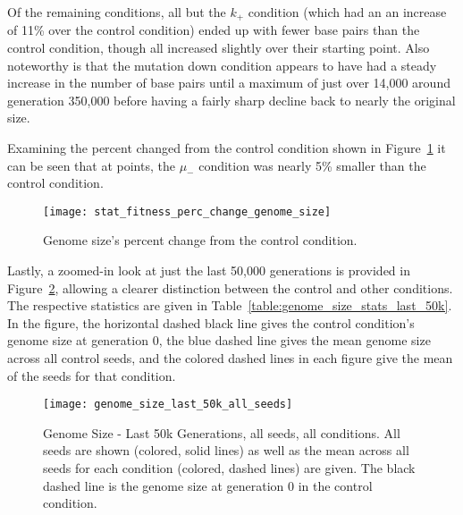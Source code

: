 Of the remaining conditions, all but the $k_+$ condition (which had an an increase of 11\% over the control condition) ended up with fewer base pairs than the control condition, though all increased slightly over their starting point. Also noteworthy is that the mutation down condition appears to have had a steady increase in the number of base pairs until a maximum of just over 14,000 around generation 350,000 before having a fairly sharp decline back to nearly the original size. 

Examining the percent changed from the control condition shown in Figure~\ref{fig:genome_size_percent_change} it can be seen that at points, the $\mu_-$ condition was nearly 5\% smaller than the control condition. 

\begin{figure}[H]
	\centering
	\texttt{[image: stat\_fitness\_perc\_change\_genome\_size]}
	\caption[Genome size - percent change]{Genome size's percent change from the control condition.}
	\label{fig:genome_size_percent_change}
\end{figure}

Lastly, a zoomed-in look at just the last 50,000 generations is provided in Figure~\ref{fig:genome_size_last_50k}, allowing a clearer distinction between the control and other conditions. The respective statistics are given in Table~\ref{table:genome_size_stats_last_50k}. In the figure, the horizontal dashed black line gives the control condition's genome size at generation 0, the blue dashed line gives the mean genome size across all control seeds, and the colored dashed lines in each figure give the mean of the seeds for that condition. 
\begin{figure}[H]
	\centering
	\texttt{[image: genome\_size\_last\_50k\_all\_seeds]}
	\caption[Genome size - last 50k generations]{Genome Size - Last 50k Generations, all seeds, all conditions. All seeds are shown (colored, solid lines) as well as the mean across all seeds for each condition (colored, dashed lines) are given. The black dashed line is the genome size at generation 0 in the control condition.}
	\label{fig:genome_size_last_50k}
\end{figure}

